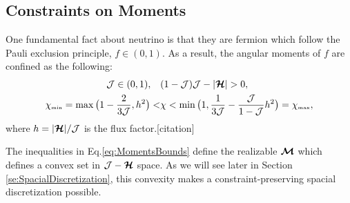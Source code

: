 \subsection{Constraints on Moments}
One fundamental fact about neutrino is that they are fermion which follow the Pauli exclusion principle, $f \in (0,1)$.
As a result, the angular moments of $f$ are confined as the following: 
\begin{align}
\mathcal{J} \in(0,1), \quad &(1-\mathcal{J})\mathcal{J}-|\boldsymbol{\mathcal{H}}|  > 0, \label{eq:MomentsBounds}\\
  \chi_{\mbox{\tiny min}}
  =\max\big(1-\frac{2}{3\mathcal{J}},h^{2}\big)
  < & \chi<\min\big(1,\frac{1}{3\mathcal{J}}-\frac{\mathcal{J}}{1-\mathcal{J}}h^{2}\big)=\chi_{\mbox{\tiny max}},
  \label{eq:eddingtonFactorBounds}
\end{align}
where $h = |\boldsymbol{\mathcal{H}}|/\mathcal{J}$ is the flux factor.[citation]

The inequalities in Eq.\ref{eq:MomentsBounds} define the realizable $\boldsymbol{\mathcal{M}}$ which defines a convex set in $\mathcal{J} -\boldsymbol{\mathcal{H}}$ space.
As we will see later in Section \ref{se:SpacialDiscretization}, this convexity makes a constraint-preserving spacial discretization possible.

